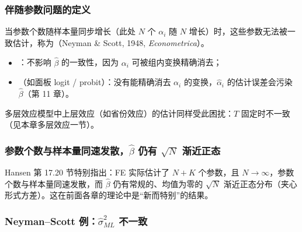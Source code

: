 \subsubsection{伴随参数问题的定义}

\begin{defn}[伴随参数问题]\label{def:U10a-incidental}
当参数个数随样本量同步增长（此处 $N$ 个 $\alpha_i$ 随 $N$ 增长）时，这些参数无法被一致估计，称为（Neyman \& Scott, 1948, \emph{Econometrica}）。
\end{defn}

\begin{itemize}
  \item {}：不影响 $\hat\beta$ 的一致性，因为 $\alpha_i$ 可被组内变换精确消去；
  \item {}（如面板 logit / probit）：没有能精确消去 $\alpha_i$ 的变换，$\hat\alpha_i$ 的估计误差会污染 $\hat\beta$（第 11 章）。
\end{itemize}
多层效应模型中上层效应（如省份效应）的估计同样受此困扰：$T$ 固定时不一致（见本章多层效应一节）。

\subsubsection{参数个数与样本量同速发散，\texorpdfstring{$\hat\beta$}{beta-hat} 仍有 \texorpdfstring{$\sqrt N$}{sqrt N} 渐近正态}

Hansen 第 17.20 节特别指出：FE 实际估计了 $N+K$ 个参数，且 $N\to\infty$，参数个数与样本量同速发散，而 $\hat\beta$ 仍有常规的、均值为零的 $\sqrt N$ 渐近正态分布（夹心形式方差）。这在前面各章的理论中是“新而特别”的结果。

\subsubsection{Neyman--Scott 例：\texorpdfstring{$\hat\sigma^2_{ML}$}{sigma2\_ML} 不一致}


